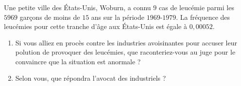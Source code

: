 
\begin{exercice}\label{exosmath-0380}

Une petite ville des États-Unis, Woburn, a connu $9$ cas de leucémie parmi les $5969$ garçons de moins de $15$ ans sur la période $1969$-$1979$. La fréquence des leucémies pour cette tranche d’âge aux États-Unis est égale à $0,00052$.

\begin{enumerate}
    \item
        
Si vous alliez en procès contre les industries avoisinantes pour accuser leur polution de provoquer des leucémies, que raconteriez-vous au juge pour le convaincre que la situation est anormale ?
\item
    Selon vous, que répondra l'avocat des industriels ?
\end{enumerate}

\end{exercice}
